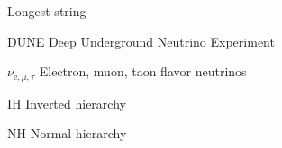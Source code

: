 
\begin{glossary}{Longest  string}
    \item[DUNE]
        Deep Underground Neutrino Experiment
    \item[$\nu_{\mathrm e, \mu, \tau}$]
        Electron, muon, taon flavor neutrinos
    \item[IH]
        Inverted hierarchy
    \item[NH]
        Normal hierarchy
\end{glossary}
